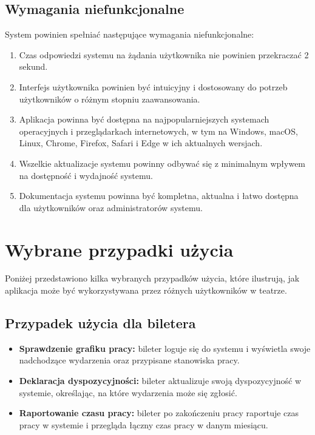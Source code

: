 \documentclass[shortabstract]{iithesis}
\begin{document}
\subsection{Wymagania niefunkcjonalne}
System powinien spełniać następujące wymagania niefunkcjonalne:
\begin{enumerate}
  \item Czas odpowiedzi systemu na żądania użytkownika nie powinien przekraczać 2 sekund.
  \item Interfejs użytkownika powinien być intuicyjny i dostosowany do potrzeb użytkowników o różnym stopniu zaawansowania.
  \item Aplikacja powinna być dostępna na najpopularniejszych systemach operacyjnych i przeglądarkach internetowych, w tym na Windows, macOS, Linux, Chrome, Firefox, Safari i Edge w ich aktualnych wersjach.
  \item Wszelkie aktualizacje systemu powinny odbywać się z minimalnym wpływem na dostępność i wydajność systemu.
  \item Dokumentacja systemu powinna być kompletna, aktualna i łatwo dostępna dla użytkowników oraz administratorów systemu.
\end{enumerate}

\section{Wybrane przypadki użycia}

Poniżej przedstawiono kilka wybranych przypadków użycia, które ilustrują, jak aplikacja może być wykorzystywana przez różnych użytkowników w teatrze.

\subsection{Przypadek użycia dla biletera}

\begin{itemize}
  \item \textbf{Sprawdzenie grafiku pracy:} bileter loguje się do systemu i wyświetla swoje nadchodzące wydarzenia oraz przypisane stanowiska pracy.
  \item \textbf{Deklaracja dyspozycyjności:} bileter aktualizuje swoją dyspozycyjność w systemie, określając, na które wydarzenia może się zgłosić.
  \item \textbf{Raportowanie czasu pracy:} bileter po zakończeniu pracy raportuje czas pracy w systemie i przegląda łączny czas pracy w danym miesiącu.
\end{itemize}
\end{document}
